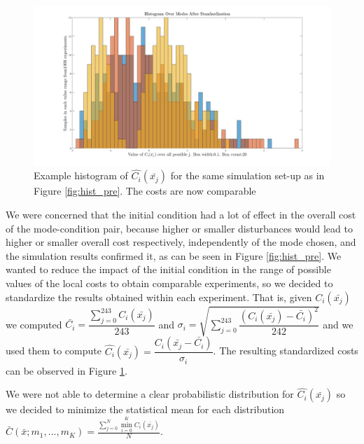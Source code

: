 \documentclass[12,twoside]{TFG-GM}
\theoremstyle{definition}
\theoremstyle{remark}
\newcommand*\mean[1]{\bar{#1}}
\newcommand*\diff[1]{\bar{#1}}
\begin{document}
\begin{figure}[htb!]
\begin{center}
\includegraphics[width=16cm]{hist_after_std.jpg}
\caption{\label{fig:hist_post} \small Example histogram of $\hat{C_i}(\diff{x_j})$ for the same simulation set-up as in Figure \ref{fig:hist_pre}. The costs are now comparable}
\end{center}
\end{figure}

We were concerned that the initial condition had a lot of effect in the overall cost of the mode-condition pair, because higher or smaller disturbances would lead to higher or smaller overall cost respectively, independently of the mode chosen, and the simulation results confirmed it, as can be seen in Figure \ref{fig:hist_pre}. We wanted to reduce the impact of the initial condition in the range of possible values of the local costs to  obtain comparable experiments, so we decided to standardize the results obtained within each experiment. That is, given $C_i(\diff{x_j})$ we computed $\mean{C_i} = \dfrac{\sum\limits_{j = 0}^{243}{C_i(\diff{x_j})}}{243}$ and $\sigma_i = \sqrt{\sum\limits_{j=0}^{243}{\dfrac{(C_i(\diff{x_j}) - \diff{C_i})^2} {242}}}$ and we used them to compute $\hat{C_i}(\diff{x_j}) = \dfrac{C_i(\diff{x_j} - \diff{C_i})}{\sigma_i}$. The resulting standardized costs can be observed in Figure \ref{fig:hist_post}.

We were not able to determine a clear probabilistic distribution for $\hat{C_i}(\diff{x_j})$ so we decided to minimize the statistical mean for each distribution $ \bar{C}(\diff{x}; m_1, ..., m_K) = \frac{\sum\limits_{j=0}^{N}{\min\limits_{i = 0}^{K}{C_i(\diff{x_j})}}}{N}$.
\end{document}
